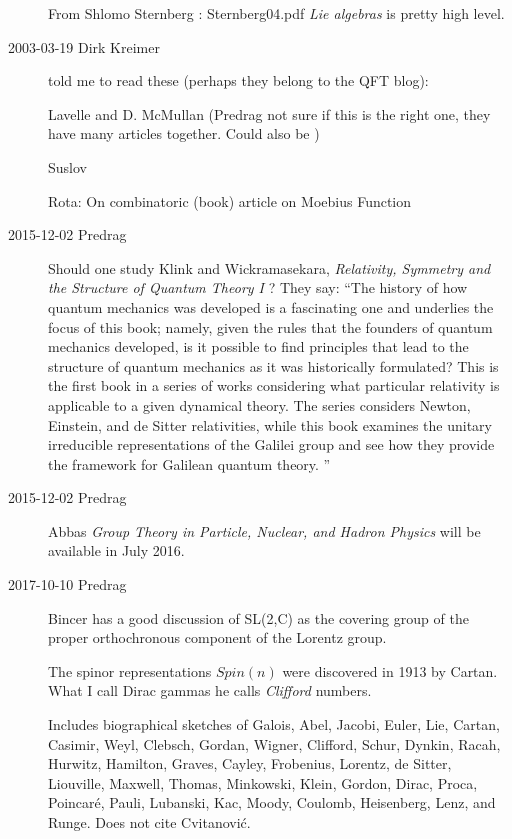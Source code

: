 \begin{description}
From Shlomo Sternberg
:
Sternberg04.pdf {\em Lie algebras} is pretty high level.

\item[2003-03-19  Dirk Kreimer] told me to
read these (perhaps they belong to the QFT blog):

Lavelle and D. McMullan
(Predrag not sure if this is the right one, they have many articles together.
Could also be )

Suslov

Rota: On combinatoric (book)
	article on Moebius Function


\item[2015-12-02  Predrag]
Should one study
Klink and Wickramasekara,
{\em Relativity, Symmetry and the Structure of Quantum Theory I} ?
They say: ``The history of how quantum mechanics was developed is a
fascinating one and underlies the focus of this book; namely, given the
rules that the founders of quantum mechanics developed, is it possible to
find principles that lead to the structure of quantum mechanics as it was
historically formulated? This is the first book in a series of works
considering what particular relativity is applicable to a given dynamical
theory. The series considers Newton, Einstein, and de Sitter
relativities, while this book examines the unitary irreducible
representations of the Galilei group and see how they provide the
framework for Galilean quantum theory.
''

\item[2015-12-02  Predrag] Abbas {\em Group Theory
in Particle, Nuclear, and Hadron Physics} will be available in July 2016.

\item[2017-10-10  Predrag]
Bincer has a good discussion of SL(2,C) as the covering
group of the proper orthochronous component  of the Lorentz group.

The spinor representations $Spin(n)$ were discovered in 1913
by Cartan. What I call Dirac gammas he calls \emph{Clifford} numbers.

Includes biographical sketches of
Galois, Abel, Jacobi, Euler, Lie, Cartan,
Casimir, Weyl, Clebsch, Gordan, Wigner,
Clifford, Schur,
Dynkin, Racah,
Hurwitz, Hamilton, Graves, Cayley, Frobenius,
Lorentz, de Sitter, Liouville, Maxwell, Thomas,
Minkowski, Klein, Gordon, Dirac, Proca,
Poincar\'e, Pauli, Lubanski, Kac, Moody,
Coulomb, Heisenberg, Lenz, and Runge. Does not cite Cvitanovi{\'c}.


\end{description}
